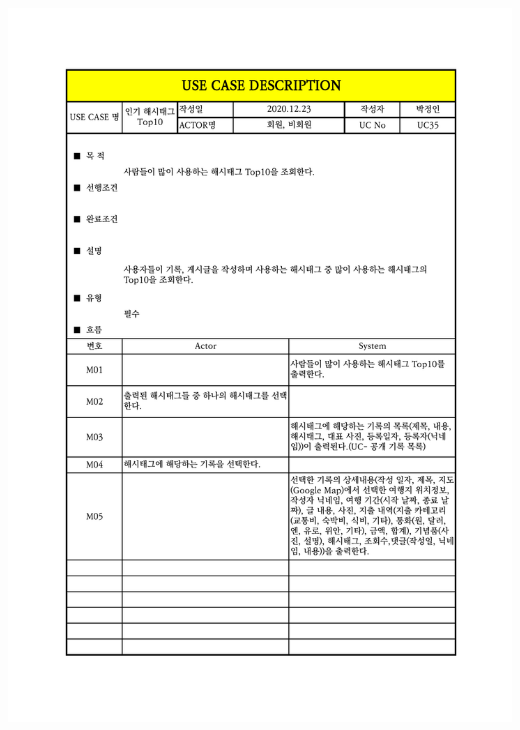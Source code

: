 {{{{{{{{{{{{{{{{{{{{{{{{{{{{{{{{{{{{{\includegraphics[width=1.1\textwidth]{./Figure/Design/Display/usecase/035.pdf} \\
}}}}}}}}}}}}}}}}}}}}}}}}}}}}}}}}}}}}}

